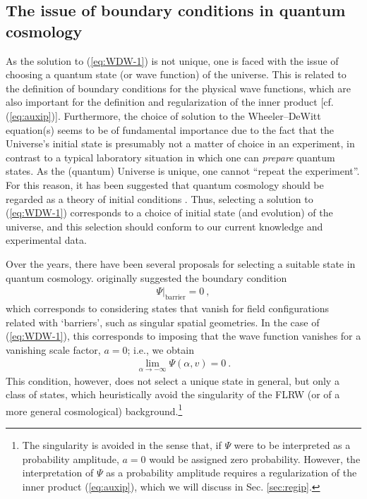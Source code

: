 \documentclass[12pt]{iopart}
\def\eq#1{\begin{equation}\begin{aligned}#1\end{aligned}\end{equation}}
\def\eref#1{(\ref{eq:#1})}
\begin{document}
\subsection{\label{sec:BCQC}The issue of boundary conditions in quantum cosmology}
As the solution to \eref{WDW-1} is not unique, one is faced with the issue of choosing a quantum state (or wave function) of the universe. This is related to the definition of boundary conditions for the physical wave functions, which are also important for the definition and regularization of the inner product [cf. \eref{auxip}]. Furthermore, the choice of solution to the Wheeler--DeWitt equation(s) seems to be of fundamental importance due to the fact that the Universe's initial state is presumably not a matter of choice in an experiment, in contrast to a typical laboratory situation in which one can \emph{prepare} quantum states. As the (quantum) Universe is unique, one cannot ``repeat the experiment''. For this reason, it has been suggested that quantum cosmology should be regarded as a theory of initial conditions \citep{Hartle:1997hw}. Thus, selecting a solution to \eref{WDW-1} corresponds to a choice of initial state (and evolution) of the universe, and this selection should conform to our current knowledge and experimental data.

Over the years, there have been several proposals for selecting a suitable state in quantum cosmology. \citet{DeWitt:1967yk} originally suggested the boundary condition
\eq{\label{eq:DeWittBC}
\Psi|_{\text{barrier}} = 0 \ ,
}
which corresponds to considering states that vanish for field configurations related with `barriers', such as singular spatial geometries. In the case of \eref{WDW-1}, this corresponds to imposing that the wave function vanishes for a vanishing scale factor, $a = 0$; i.e., we obtain
\eq{
\lim_{\alpha\to-\infty}\Psi(\alpha,v) = 0 \ .
}
This condition, however, does not select a unique state in general, but only a class of states, which heuristically avoid the singularity of the FLRW (or of a more general cosmological) background.\footnote{The singularity is avoided in the sense that, if $\Psi$ were to be interpreted as a probability amplitude, $a=0$ would be assigned zero probability. However, the interpretation of $\Psi$ as a probability amplitude requires a regularization of the inner product \eref{auxip}, which we will discuss in Sec. \ref{sec:regip}.}
\end{document}

